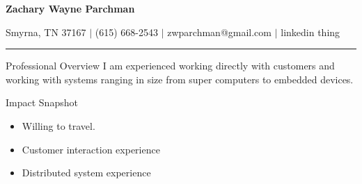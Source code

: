\documentclass{res}
\begin{document}
 


\fontsize{10}{11}\selectfont

\begin{resume}

\vspace{-25mm}
\begin{center}
    {\bf \Huge Zachary Wayne Parchman}
\end{center}
\vspace{-8mm}
%
\begin{small}
    \begin{center}
        Smyrna, TN 37167 $|$
        (615) 668-2543 $|$
        zwparchman@gmail.com $|$
        linkedin thing
        \\
    \end{center}
\end{small}
\vspace{-8mm}
\rule{\textwidth}{0.4pt}
%
\begin{minipage}[t]{0.45\textwidth}
    \begin{section}{Professional Overview}
        I am experienced working directly with customers and working with
        systems ranging in size from super computers to embedded devices. 
    \end{section}
\end{minipage}
%
\begin{minipage}[t]{0.10\textwidth}
    \hfill
\end{minipage}
%
\begin{minipage}[t]{0.45\textwidth}
    \begin{section}{Impact Snapshot}
        \begin{itemize}
            \item Willing to travel.
            \item Customer interaction experience
            \item Distributed system experience
        \end{itemize}
    \end{section}
\end{minipage}


\end{resume}
\end{document}
